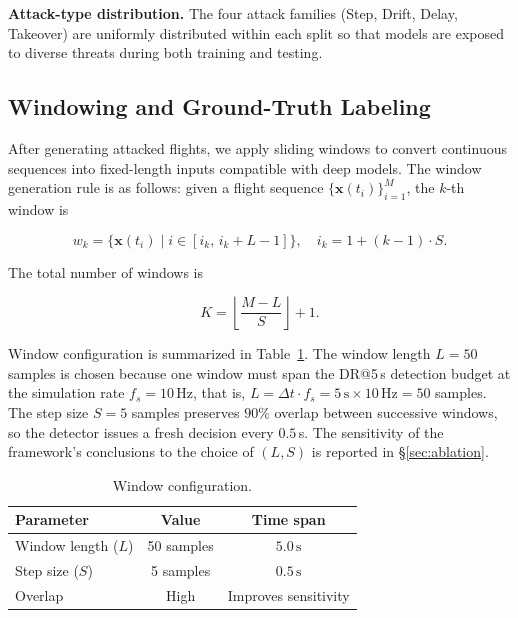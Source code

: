 \documentclass{ieeeaccess}
\begin{document}
\textbf{Attack-type distribution.} The four attack families (Step, Drift, Delay, Takeover) are uniformly distributed within each split so that models are exposed to diverse threats during both training and testing.

\subsection{Windowing and Ground-Truth Labeling}

After generating attacked flights, we apply sliding windows to convert continuous sequences into fixed-length inputs compatible with deep models. The window generation rule is as follows: given a flight sequence $\{\mathbf{x}(t_i)\}_{i=1}^{M}$, the $k$-th window is

\begin{equation}
w_k = \{\mathbf{x}(t_i)\mid i\in[i_k,\, i_k+L-1]\},\quad i_k = 1+(k-1)\cdot S.
\end{equation}

The total number of windows is

\begin{equation}
K = \left\lfloor\frac{M-L}{S}\right\rfloor + 1.
\end{equation}

Window configuration is summarized in Table~\ref{tab:window-config}.
The window length $L=50$ samples is chosen because one window must span the
DR@5\,s detection budget at the simulation rate $f_s = 10$\,Hz, that is,
$L = \Delta t \cdot f_s = 5\,\text{s} \times 10\,\text{Hz} = 50$ samples.
The step size $S=5$ samples preserves $90\%$ overlap between successive windows,
so the detector issues a fresh decision every $0.5$\,s.
The sensitivity of the framework's conclusions to the choice of $(L, S)$ is
reported in \S\ref{sec:ablation}.

\begin{table}[!t]
\caption{Window configuration.}
\label{tab:window-config}
\centering
\begin{tabular}{lcc}
\hline
\textbf{Parameter} & \textbf{Value} & \textbf{Time span} \\
\hline
Window length ($L$) & 50 samples & $5.0\,\mathrm{s}$ \\
Step size ($S$) & 5 samples & $0.5\,\mathrm{s}$ \\
Overlap & High & Improves sensitivity \\
\hline
\end{tabular}
\end{table}
\end{document}
